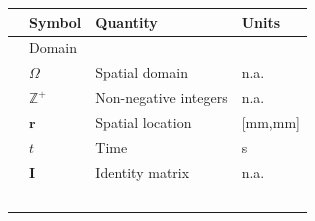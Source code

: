 \documentclass[10pt,twocolumn,twoside]{IEEEtran}
\begin{document}
\begin {table}[t]
\begin{center}
	{\tiny\begin{tabular}{llll}
	\hline \hline
	& Symbol & Quantity & Units\\ 
	\hline 
	& Domain&& \\
	& $\Omega$ &Spatial domain& n.a.
\\ 
	& $\mathbb{Z}^{+}$ &Non-negative integers& n.a.
\\ 
	& $\mathbf{r}$ &Spatial location& [mm,mm]\\ 
	& $t$ &Time & s \\  
	& $\mathbf I$ & Identity matrix & n.a.
\\ 
\\ 
\\ 
\\  
\\  
\\  


\end{tabular}}
\end{center}
\end{table}
\end{document}
